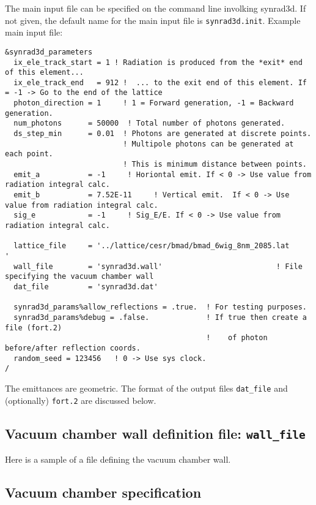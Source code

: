 \documentclass[11pt,landscape]{article}
\begin{document}
The main input file can be specified on the command line involking synrad3d.
If not given, the default name for the main input file is \texttt{synrad3d.init}.
Example main input file:
\begin{verbatim}
&synrad3d_parameters
  ix_ele_track_start = 1 ! Radiation is produced from the *exit* end of this element...
  ix_ele_track_end   = 912 !  ... to the exit end of this element. If = -1 -> Go to the end of the lattice
  photon_direction = 1     ! 1 = Forward generation, -1 = Backward generation.
  num_photons      = 50000  ! Total number of photons generated. 
  ds_step_min      = 0.01  ! Photons are generated at discrete points. 
                           ! Multipole photons can be generated at each point.
                           ! This is minimum distance between points.
  emit_a           = -1     ! Horiontal emit. If < 0 -> Use value from radiation integral calc.
  emit_b           = 7.52E-11     ! Vertical emit.  If < 0 -> Use value from radiation integral calc.
  sig_e            = -1     ! Sig_E/E. If < 0 -> Use value from radiation integral calc.

  lattice_file     = '../lattice/cesr/bmad/bmad_6wig_8nm_2085.lat                         ' 
  wall_file        = 'synrad3d.wall'                          ! File specifying the vacuum chamber wall
  dat_file         = 'synrad3d.dat'

  synrad3d_params%allow_reflections = .true.  ! For testing purposes.
  synrad3d_params%debug = .false.             ! If true then create a file (fort.2) 
                                              !    of photon before/after reflection coords.
  random_seed = 123456   ! 0 -> Use sys clock.
/
\end{verbatim}
The emittances are geometric. The format of the output files
\texttt{dat\_file} and (optionally) \texttt{fort.2} are discussed
below.  

\subsection{Vacuum chamber wall definition file: \texttt{wall\_file}} 

Here is a sample of a file defining the vacuum
chamber wall.

\subsection{Vacuum chamber specification}
\end{document}
